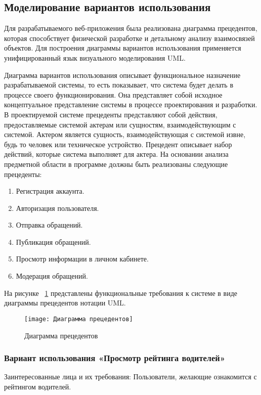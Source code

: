 \subsection{Моделирование вариантов использования}

Для разрабатываемого веб-приложения была реализована диаграмма прецедентов, которая способствует физической разработке и детальному анализу взаимосвязей объектов. Для построения диаграммы вариантов использования применяется унифицированный язык визуального моделирования UML. 

Диаграмма вариантов использования описывает функциональное назначение разрабатываемой системы, то есть показывает, что система будет делать в процессе своего функционирования. Она представляет собой исходное концептуальное представление системы в процессе проектирования и разработки. В проектируемой системе прецеденты представляют собой действия, предоставляемые системой актерам или сущностям, взаимодействующим с системой. Актером является сущность, взаимодействующая с системой извне, будь то человек или техническое устройство. Прецедент описывает набор действий, которые система выполняет для актера.
На основании анализа предметной области в программе должны быть реализованы следующие прецеденты:
\begin{enumerate}
\item Регистрация аккаунта.
\item Авторизация пользователя.
\item Отправка обращений.
\item Публикация обращений.
\item Просмотр информации в личном кабинете.
\item Модерация обращений.
\end{enumerate}

На рисунке ~\ref{templ:image0} представлены функциональные требования к системе в виде диаграммы прецедентов нотации UML.
\begin{figure}[H]
	\texttt{[image: Диаграмма прецедентов]}
	\caption{Диаграмма прецедентов}
	\label{templ:image0}
\end{figure}

\subsubsection {Вариант использования «Просмотр рейтинга водителей»}
Заинтересованные лица и их требования: Пользователи, желающие ознакомится с рейтингом водителей.

